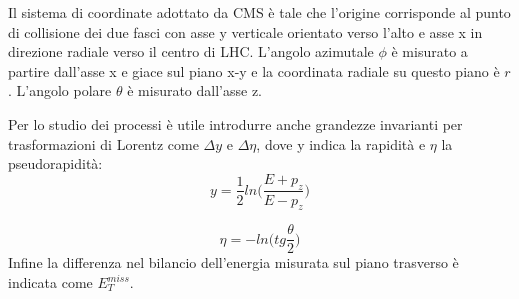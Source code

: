 Il sistema di coordinate adottato da CMS è tale che l'origine corrisponde al punto di collisione dei due fasci con asse y verticale orientato verso l'alto e asse x in direzione radiale verso il centro di LHC. L'angolo azimutale $\phi$ è misurato a partire dall'asse x e giace sul piano x-y e la coordinata radiale su questo piano è $r$. L'angolo polare $\theta$ è misurato dall'asse z. 

Per lo studio dei processi è utile introdurre anche grandezze invarianti per trasformazioni di Lorentz come $\Delta y$ e $\Delta \eta$, dove y indica la rapidità e $\eta$ la pseudorapidità:
\begin{equation}
y= \dfrac{1}{2} ln\Big( \dfrac{E+p_z}{E-p_z}\Big)
\end{equation}

\begin{equation}
\eta = - ln \Big( tg\frac{\theta}{2}\Big)
\end{equation}
Infine la differenza nel bilancio dell'energia misurata sul piano trasverso è indicata come $E_T^{miss}$.


